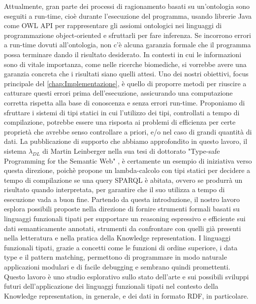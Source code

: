Attualmente, gran parte dei processi di ragionamento basati su un'ontologia sono eseguiti a run-time, cioè durante l'esecuzione del programma, usando librerie Java come OWL API \cite{OWLAPI} per rappresentare gli assiomi ontologici nei linguaggi di programmazione object-oriented e sfruttarli per fare inferenza. Se incorrono errori a run-time dovuti all'ontologia, non c'è alcuna garanzia formale che il programma possa terminare dando il risultato desiderato. In contesti in cui le informazioni sono di vitale importanza, come nelle ricerche biomediche, si vorrebbe avere una garanzia concreta che i risultati siano quelli attesi. Uno dei nostri obiettivi, focus principale del \autoref{chap:Implementazione}, è quello di proporre metodi per riuscire a catturare questi errori prima dell'esecuzione, assicurando una computazione corretta rispetta alla base di conoscenza e senza errori run-time. Proponiamo di sfruttare i sistemi di tipi statici in cui l'utilizzo dei tipi, controllati a tempo di compilazione, potrebbe essere una risposta ai problemi di efficienza per certe proprietà che avrebbe senso controllare a priori, e/o nel caso di grandi quantità di dati. La pubblicazione di supporto che abbiamo approfondito in questo lavoro, il sistema $\lambda_{DL}$ di Martin Leinberger nella sua tesi di dottorato "Type-safe Programming for the Semantic Web" \cite{leinbergerphdthesis}, è certamente un esempio di iniziativa verso questa direzione, poichè propone un lambda-calcolo con tipi statici per decidere a tempo di compilazione se una query SPARQL è abitata, ovvero se produrrà un risultato quando interpretata, per garantire che il suo utilizza a tempo di esecuzione vada a buon fine.
Partendo da questa introduzione, il nostro lavoro esplora possibili proposte nella direzione di fornire strumenti formali basati su linguaggi funzionali tipati per supportare un reasoning espressivo e efficiente sui dati semanticamente annotati, strumenti da confrontare con quelli già presenti nella letteratura e nella pratica della Knowledge representation. I linguaggi funzionali tipati, grazie a concetti come le funzioni di ordine superiore, i data type e il pattern matching, permettono di programmare in modo naturale applicazioni modulari e di facile debugging e sembrano quindi promettenti.\\
Questo lavoro è uno studio esplorativo sullo stato dell’arte e sui possibili sviluppi futuri dell’applicazione dei linguaggi funzionali tipati nel contesto della Knowledge representation, in generale, e dei dati in formato RDF, in particolare.




